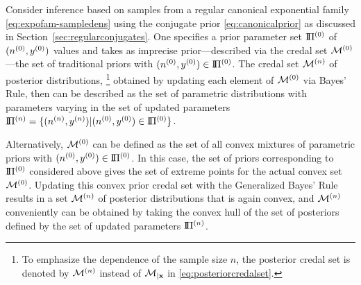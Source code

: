 Consider inference based on samples from a regular canonical exponential family \eqref{eq:expofam-sampledens}
using the conjugate prior \eqref{eq:canonicalprior} as discussed in Section~\ref{sec:regularconjugates}.
One specifies a prior parameter set $\text{I}\!\Pi^{(0)}$ of $(n^{(0)},y^{(0)})$ values
and takes as imprecise prior---described via the credal set $\mathcal{M}^{(0)}$---the set of traditional priors with $(n^{(0)}, y^{(0)}) \in \text{I}\!\Pi^{(0)}$.
The credal set $\mathcal{M}^{(n)}$ of posterior distributions,%
\footnote{To emphasize the dependence of the sample size $n$,
the posterior credal set is denoted by $\mathcal{M}^{(n)}$ instead of $\mathcal{M}_{\vert \mathbf{x}}$ in \eqref{eq:posteriorcredalset}.}
obtained by updating each element of $\mathcal{M}^{(0)}$ via Bayes' Rule,
then can be described as the set of parametric distributions
with parameters varying in the set of updated parameters $\text{I}\!\Pi^{(n)} = \{(n^{(n)},y^{(n)}) \vert (n^{(0)}, y^{(0)}) \in \text{I}\!\Pi^{(0)}\}$.

Alternatively, $\mathcal{M}^{(0)}$ can be defined as the set of all convex mixtures of parametric priors with $(n^{(0)}, y^{(0)}) \in \text{I}\!\Pi^{(0)}$.
In this case, the set of priors corresponding to $\text{I}\!\Pi^{(0)}$ considered above gives the set of extreme points for the actual convex set $\mathcal{M}^{(0)}$.
Updating this convex prior credal set with the Generalized Bayes' Rule results in a set $\mathcal{M}^{(n)}$ of posterior distributions that is again convex,
and $\mathcal{M}^{(n)}$ conveniently can be obtained by taking the convex hull of the set of posteriors
defined by the set of updated parameters $\text{I}\!\Pi^{(n)}$.

